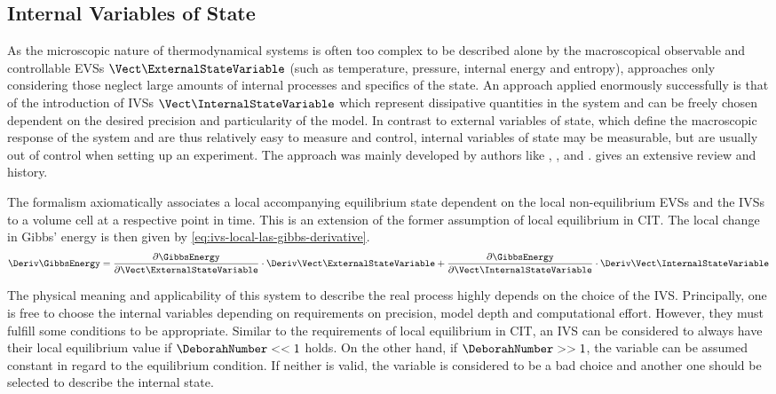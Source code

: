 \subsection{Internal Variables of State}\label{subsec:internal-variables-of-state}

As the microscopic nature of thermodynamical systems is often too complex to be described alone by the macroscopical observable and controllable \glspl{EVS} $\Vect\ExternalStateVariable$ (such as temperature, pressure, internal energy and entropy), approaches only considering those neglect large amounts of internal processes and specifics of the state.
An approach applied enormously successfully is that of the introduction of \glspl{IVS} $\Vect\InternalStateVariable$ which represent dissipative quantities in the system and can be freely chosen dependent on the desired precision and particularity of the model.
In contrast to external variables of state, which define the macroscopic response of the system and are thus relatively easy to measure and control, internal variables of state may be measurable, but are usually out of control when setting up an experiment.
The approach was mainly developed by authors like \textcite{Bataille1979}, \textcite{Kestin1990, Kestin1992}, \textcite{Muschik1990} and \textcite{Maugin1994, Maugin1994a}.
\textcite{Maugin2015} gives an extensive review and history.

The formalism axiomatically associates a local accompanying equilibrium state dependent on the local non-equilibrium \glspl{EVS} and the \glspl{IVS} to a volume cell at a respective point in time.
This is an extension of the former assumption of local equilibrium in \gls{CIT}.
The local change in Gibbs' energy is then given by \cref{eq:ivs-local-las-gibbs-derivative}.
\begin{equation}
    \Deriv\GibbsEnergy = \frac{\partial \GibbsEnergy}{\partial \Vect\ExternalStateVariable} \cdot \Deriv\Vect\ExternalStateVariable + \frac{\partial \GibbsEnergy}{\partial \Vect\InternalStateVariable} \cdot \Deriv\Vect\InternalStateVariable
    \label{eq:ivs-local-las-gibbs-derivative}
\end{equation}

The physical meaning and applicability of this system to describe the real process highly depends on the choice of the \gls{IVS}.
Principally, one is free to choose the internal variables depending on requirements on precision, model depth and computational effort.
However, they must fulfill some conditions to be appropriate.
Similar to the requirements of local equilibrium in \gls{CIT}, an \gls{IVS} can be considered to always have their local equilibrium value if $\DeborahNumber << 1$ holds.
On the other hand, if $\DeborahNumber >> 1$, the variable can be assumed constant in regard to the equilibrium condition.
If neither is valid, the variable is considered to be a bad choice and another one should be selected to describe the internal state.

